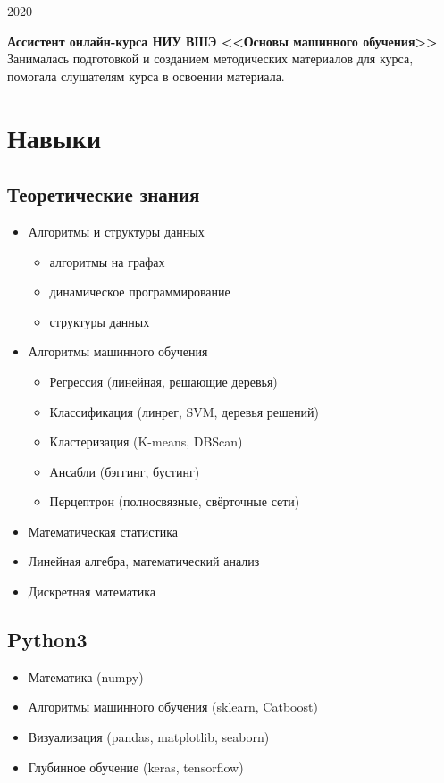 \documentclass{article}
\newcommand{\entry}[3]{
    \begin{minipage}[t]{.11\linewidth}
        \hfill \textsc{#1}
    \end{minipage}
    \hfill\vline\hfill
    \begin{minipage}[t]{.80\linewidth}
        \textbf{#2}\\
        \footnotesize{#3}
    \end{minipage}
}
\begin{document}
    \vspace{.2cm}
    \entry {2020} 
    {Ассистент онлайн-курса НИУ ВШЭ <<Основы машинного обучения>>}
    {Занималась подготовкой и созданием методических материалов для курса, помогала слушателям курса в освоении материала.}


    \section{Навыки}
    \begin{multicols}{2}
        \subsection{Теоретические знания}
        \begin{itemize}
                \item Алгоритмы и структуры данных
                \begin{itemize}
                        \item алгоритмы на графах
                        \item динамическое программирование
                        \item структуры данных
                \end{itemize}
                \item Алгоритмы машинного обучения
                \begin{itemize}
                        \item Регрессия (линейная, решающие деревья)
                        \item Классификация (линрег, SVM, деревья решений)
                        \item Кластеризация (K-means, DBScan)
                        \item Ансабли (бэггинг, бустинг)
                        \item Перцептрон (полносвязные, свёрточные сети)
                \end{itemize}
                \item Математическая статистика
                \item Линейная алгебра, математический анализ
                \item Дискретная математика
            \end{itemize}
        \subsection{Python3}
            \begin{itemize}
                \item Математика (numpy)
                \item Алгоритмы машинного обучения (sklearn, Catboost)
                \item Визуализация (pandas, matplotlib, seaborn)
                \item Глубинное обучение (keras, tensorflow)
            \end{itemize}

\end{multicols}
\end{document}
